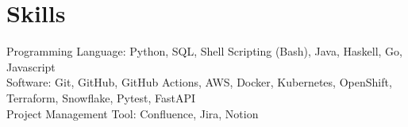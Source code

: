 \documentclass[12pt,letterpaper,sans]{moderncv}        %
\begin{document}

\vspace{0.5em}




\vspace{-1.0em}


\section{Skills}
\begin{small}
Programming Language: Python, SQL, Shell Scripting (Bash), Java, Haskell, Go, Javascript \\
Software: Git, GitHub, GitHub Actions, AWS, Docker, Kubernetes, OpenShift, Terraform, Snowflake, Pytest, FastAPI \\ %
Project Management Tool: Confluence, Jira, Notion
\end{small}


\vspace{-0.5em}


\end{document}

